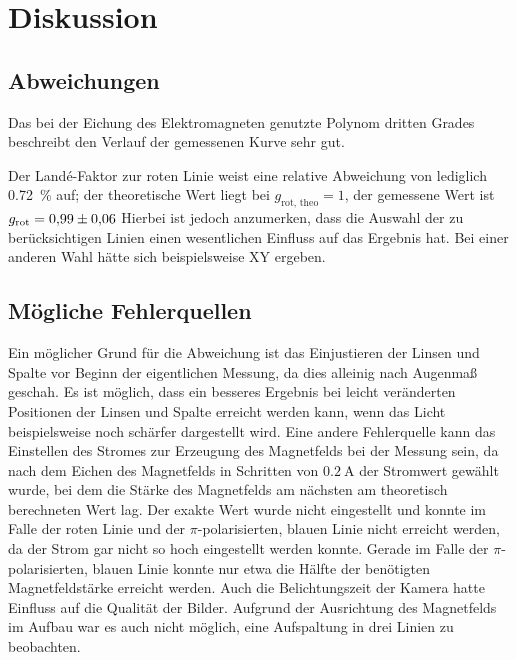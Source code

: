 \section{Diskussion}
\label{sec:diskussion}

\subsection{Abweichungen}

Das bei der Eichung des Elektromagneten genutzte Polynom dritten Grades
beschreibt den Verlauf der gemessenen Kurve sehr gut.


Der Landé-Faktor zur roten Linie weist eine relative Abweichung von lediglich \SI{0.72}{\percent} auf;
der theoretische Wert liegt bei $g_\text{rot, theo} = 1$,
der gemessene Wert ist $g_\text{rot} = \num{0.99 \pm 0.06}$
Hierbei ist jedoch anzumerken, dass die Auswahl der zu berücksichtigen Linien einen wesentlichen Einfluss
auf das Ergebnis hat.
Bei einer anderen Wahl hätte sich beispielsweise XY ergeben.


\subsection{Mögliche Fehlerquellen}

    Ein möglicher Grund für die Abweichung ist das Einjustieren der Linsen und Spalte vor Beginn der eigentlichen Messung,
    da dies alleinig nach Augenmaß geschah.
    Es ist möglich,
    dass ein besseres Ergebnis bei leicht veränderten Positionen der Linsen und Spalte erreicht werden kann,
    wenn das Licht beispielsweise noch schärfer dargestellt wird.
    Eine andere Fehlerquelle kann das Einstellen des Stromes zur Erzeugung des Magnetfelds bei der Messung sein,
    da nach dem Eichen des Magnetfelds in Schritten von $\SI{0.2}{\ampere}$ der Stromwert gewählt wurde,
    bei dem die Stärke des Magnetfelds am nächsten am theoretisch berechneten Wert lag.
    Der exakte Wert wurde nicht eingestellt
    und konnte im Falle der roten Linie und der $\pi$-polarisierten, blauen Linie nicht erreicht werden,
    da der Strom gar nicht so hoch eingestellt werden konnte.
    Gerade im Falle der $\pi$-polarisierten, blauen Linie konnte nur etwa die Hälfte der benötigten Magnetfeldstärke erreicht werden.
    Auch die Belichtungszeit der Kamera hatte Einfluss auf die Qualität der Bilder.
    Aufgrund der Ausrichtung des Magnetfelds im Aufbau war es auch nicht möglich,
    eine Aufspaltung in drei Linien zu beobachten.
